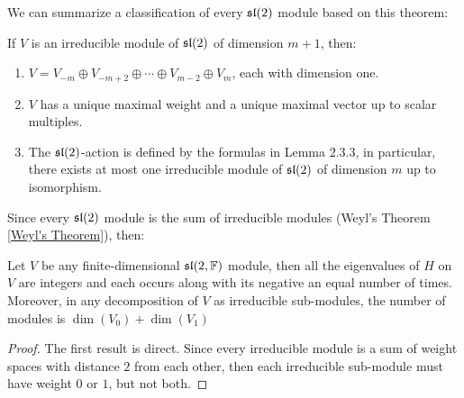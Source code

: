 We can summarize a classification of every  $\mathfrak{sl}(2)$ module based on this theorem:
\begin{teo}
If $V$ is an irreducible module of $\mathfrak{sl}(2)$ of dimension $m+1$, then:
\begin{enumerate}[label=(\alph*)]
	\item $V=V_{-m} \oplus V_{-m+2} \oplus \cdots \oplus V_{m-2} \oplus V_m$, each with dimension one.
	\item $V$ has a unique maximal weight and a unique maximal vector up to scalar multiples.
	\item The $\mathfrak{sl}(2)$-action is defined by the formulas in Lemma $2.3.3$, in particular, there exists at most one irreducible module of $\mathfrak{sl}(2)$ of dimension $m$ up to isomorphism.
\end{enumerate}
\end{teo}
Since every $\mathfrak{sl}(2)$ module is the sum of irreducible modules (Weyl's Theorem \ref{Weyl's Theorem}), then:
\begin{corol}
	Let $V$ be any finite-dimensional $\mathfrak{sl}(2,\mathbb{F})$ module, then all the eigenvalues of $H$ on $V$ are integers and each occurs along with its negative an equal number of times. Moreover, in any decomposition of $V$ as irreducible sub-modules, the number of modules is $\dim(V_0)+\dim(V_1)$
	\label{sl2modules}
\end{corol}
\begin{proof}
	The first result is direct. Since every irreducible module is a sum of weight spaces with distance $2$ from each other, then each irreducible sub-module must have weight $0$ or $1$, but not both.
\end{proof}
